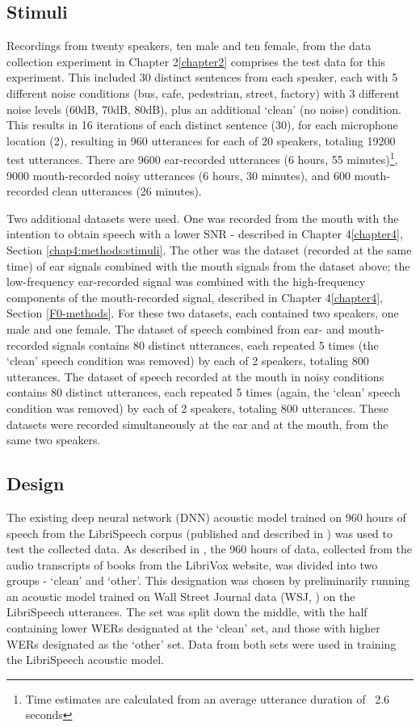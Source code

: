 \documentclass[dissertation,copyright]{uathesis}
\begin{document}
\subsection{Stimuli}

Recordings from twenty speakers, ten male and ten female, from the data collection experiment in Chapter 2\ref{chapter2} comprises the test data for this experiment.  This included 30 distinct sentences from each speaker, each with 5 different noise conditions (bus, cafe, pedestrian, street, factory) with 3 different noise levels (60dB, 70dB, 80dB), plus an additional `clean' (no noise) condition.  This results in 16 iterations of each distinct sentence (30), for each microphone location (2), resulting in 960 utterances for each of 20 speakers, totaling 19200 test utterances.  There are 9600 ear-recorded utterances (6 hours, 55 minutes)\footnote{Time estimates are calculated from an average utterance duration of ~2.6 seconds}, 9000 mouth-recorded noisy utterances (6 hours, 30 minutes), and 600 mouth-recorded clean utterances (26 minutes).

Two additional datasets were used.  One was recorded from the mouth with the intention to obtain speech with a lower SNR - described in Chapter 4\ref{chapter4}, Section \ref{chap4:methods:stimuli}.  The other was the dataset (recorded at the same time) of ear signals combined with the mouth signals from the dataset above; the low-frequency ear-recorded signal was combined with the high-frequency components of the mouth-recorded signal, described in Chapter 4\ref{chapter4}, Section \ref{F0-methods}.
For these two datasets, each contained two speakers, one male and one female.  The dataset of speech combined from ear- and mouth-recorded signals contains 80 distinct utterances, each repeated 5 times (the `clean' speech condition was removed) by each of 2 speakers, totaling 800 utterances.  The dataset of speech recorded at the mouth in noisy conditions contains 80 distinct utterances, each repeated 5 times (again, the `clean' speech condition was removed) by each of 2 speakers, totaling 800 utterances.  These datasets were recorded simultaneously at the ear and at the mouth, from the same two speakers.

\subsection{Design}

The existing deep neural network (DNN) acoustic model trained on 960 hours of speech from the LibriSpeech corpus (published and described in \cite{panayotov:15}) was used to test the collected data.  As described in \cite{panayotov:15}, the 960 hours of data, collected from the audio transcripts of books from the LibriVox website, was divided into two groups - `clean' and `other'.  This designation was chosen by preliminarily running an acoustic model trained on Wall Street Journal data (WSJ, \cite{paul:92}) on the LibriSpeech utterances. The set was split down the middle, with the half containing lower WERs designated at the `clean' set, and those with higher WERs designated as the `other' set.  Data from both sets were used in training the LibriSpeech acoustic model.
\end{document}
